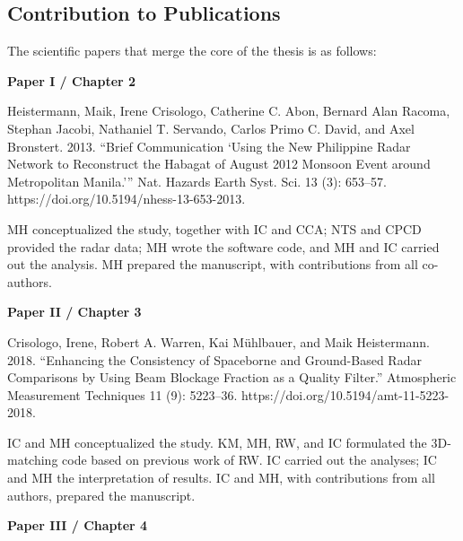 \begin{multicols}{2}

\pagebreak



\section*{Contribution to Publications}
\label{ContPub}


The scientific papers that merge the core of the thesis is as follows:

\bigskip

\textbf{Paper I / Chapter 2}

\medskip

\noindent \hangindent=0.6cm Heistermann, Maik, Irene Crisologo, Catherine C. Abon, Bernard Alan Racoma, Stephan Jacobi, Nathaniel T. Servando, Carlos Primo C. David, and Axel Bronstert. 2013. “Brief Communication ‘Using the New Philippine Radar Network to Reconstruct the Habagat of August 2012 Monsoon Event around Metropolitan Manila.’” Nat. Hazards Earth Syst. Sci. 13 (3): 653–57. https://doi.org/10.5194/nhess-13-653-2013.

\medskip

MH conceptualized the study, together with IC and CCA; NTS and CPCD provided the radar data; MH wrote the software code, and MH and IC carried out the analysis. MH prepared the manuscript, with contributions from all co-authors.

\bigskip

\textbf{Paper II / Chapter 3}

\medskip

\noindent \hangindent=0.6cm Crisologo, Irene, Robert A. Warren, Kai Mühlbauer, and Maik Heistermann. 2018. “Enhancing the Consistency of Spaceborne and Ground-Based Radar Comparisons by Using Beam Blockage Fraction as a Quality Filter.” Atmospheric Measurement Techniques 11 (9): 5223–36. https://doi.org/10.5194/amt-11-5223-2018.

\medskip

IC and MH conceptualized the study. KM, MH, RW, and IC formulated the 3D-matching code based on previous work of RW. IC carried out the analyses; IC and MH the interpretation of results. IC and MH, with contributions from all authors, prepared the manuscript.

\bigskip

\textbf{Paper III / Chapter 4}


\end{multicols}
